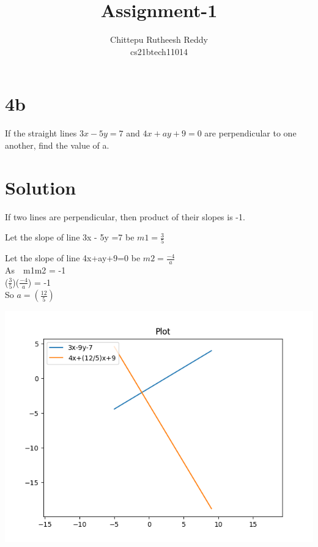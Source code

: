 \documentclass[18pt]{article}
\title{\textbf{Assignment-1}}
\author{Chittepu Rutheesh Reddy \\
  cs21btech11014}
\begin{document}
\maketitle{}

\section*{4b}

If the straight lines $3x- 5y = 7$ and $4x+ ay+ 9 = 0$ are perpendicular to one 
another, find the value of a.

\section*{Solution}
If two lines are perpendicular, then product of their slopes is -1.
\bigskip

   Let the slope of line 3x - 5y =7 be $m1=\frac{3}{5}$
 \bigskip
   
   Let the slope of line 4x+ay+9=0 be $m2=\frac{-4}{a}$ 
  \\
   
   As  \,\, m1m2 = -1
   \\ 
   
   ($\frac{3}{5}$)($\frac{-4}{a}$) = -1 
  \\
 
   So    $a = (\frac{12}{5})$ \\
  
  \graphicspath{{D:/Semester 2/Probability and Random Variables AI1110/Assignments/1/}}   
\includegraphics[scale=0.5]{Figure_1}
\end{document}
